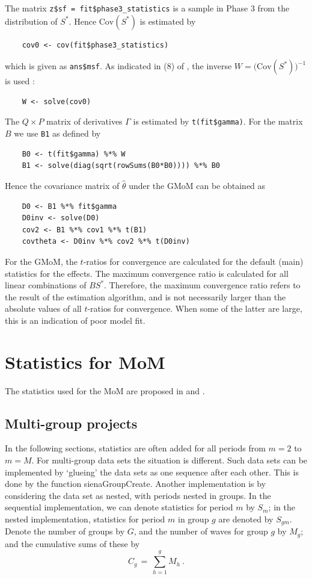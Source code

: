\documentclass[a4paper,12pt,fleqn]{article}
\newcommand{\Cov}{\mbox{Cov}}
\newcommand{\nm}[1]{\textsf{\small #1}}
\begin{document}
The matrix \texttt{z\$sf = fit\$phase3\_statistics} is a sample in Phase 3
from the distribution of $S^\ast$.
Hence $\Cov(S^\ast)$ is estimated by
\begin{verbatim}
    cov0 <- cov(fit$phase3_statistics)
\end{verbatim}
which is given as \texttt{ans\$msf}.
As indicated in (8) of \citet{ASS2015},
the inverse  $W = \big(\Cov(S^\ast)\big)^{-1}$  is used :
\begin{verbatim}
    W <- solve(cov0)
\end{verbatim}
The $Q \times P$ matrix of derivatives $\Gamma$ is
estimated by \texttt{t(fit\$gamma)}.
For the matrix $B$ we use \texttt{B1} as defined by
\begin{verbatim}
    B0 <- t(fit$gamma) %*% W
    B1 <- solve(diag(sqrt(rowSums(B0*B0)))) %*% B0
\end{verbatim}
Hence the covariance matrix of $\hat\theta$ under the GMoM
can be obtained as
\begin{verbatim}
    D0 <- B1 %*% fit$gamma
    D0inv <- solve(D0)
    cov2 <- B1 %*% cov1 %*% t(B1)
    covtheta <- D0inv %*% cov2 %*% t(D0inv)
\end{verbatim}

For the GMoM, the $t$-ratios for convergence are calculated
for the default (main) statistics for the effects.
The maximum convergence ratio is calculated for all linear
combinations of $B S^\ast$.
Therefore, the maximum convergence ratio refers to the
result of the estimation algorithm, and is not
necessarily larger than the absolute values of
all  $t$-ratios for convergence. When some of the latter are large,
this is an indication of poor model fit.


\section{Statistics for MoM}
\label{S_stats}

The statistics used for the MoM are proposed in
\citet{Snijders01} and \citet{SnijdersEA07}.


\subsection{Multi-group projects}

In the following sections, statistics are often added for all periods
from $m=2$ to $m=M$. For multi-group data sets the situation is different.
Such data sets can be implemented by `glueing' the data sets
as one sequence after each other.
This is done by the function \nm{sienaGroupCreate}.
Another implementation is by considering the data set as nested,
with periods nested in groups.
In the sequential implementation, we can denote statistics for period
$m$ by $S_m$; in the nested implementation, statistics for period
$m$ in group $g$ are denoted by $S_{gm}$.
Denote the number of groups by $G$, and the number of waves for
group $g$ by $M_g$; and the cumulative sums of these by
\[
    C_g \,=\, \sum_{h=1}^g M_h \ .
\]
\end{document}
